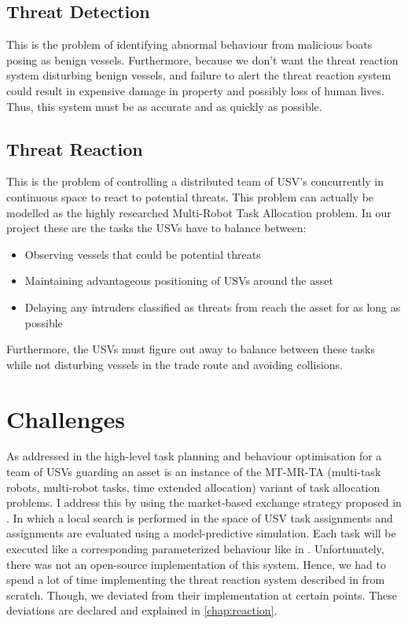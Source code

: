 \documentclass[bsc,frontabs,twoside,singlespacing,parskip,deptreport]{infthesis}     %
\begin{document}
\subsection{Threat Detection}
This is the problem of identifying abnormal behaviour from malicious boats posing as benign vessels. Furthermore, because we don't want the threat reaction system disturbing benign vessels, and failure to alert the threat reaction system could result in expensive damage in property and possibly loss of human lives. Thus, this system must be as accurate and as quickly as possible. 

\subsection{Threat Reaction}
This is the problem of controlling a distributed team of USV's concurrently in continuous space to react to potential threats. This problem can actually be modelled as the highly researched Multi-Robot Task Allocation problem. In our project these are the tasks the USVs have to balance between:

\begin{itemize}
    \item Observing vessels that could be potential threats
    \item Maintaining advantageous positioning of USVs around the asset
    \item Delaying any intruders classified as threats from reach the asset for as long as possible
\end{itemize}
Furthermore, the USVs must figure out away to balance between these tasks while not disturbing \nonthreatening vessels in the trade route and avoiding collisions.

\section{Challenges}
As addressed in \cite{raboin2013model} the high-level task planning and behaviour optimisation for a team of USVs guarding an asset is an instance of the MT-MR-TA (multi-task robots, multi-robot tasks, time extended allocation) variant of task allocation problems. I address this by using the market-based exchange strategy proposed in \cite{raboin2013model}. In which a local search is performed in the space of USV task assignments and assignments are evaluated using a model-predictive simulation. Each task will be executed like a corresponding parameterized behaviour like in \cite{raboin2013model}.
Unfortunately, there was not an open-source implementation of this system. Hence, we had to spend a lot of time implementing the threat reaction system described in \citep{raboin2013model} from scratch. Though, we deviated from their implementation at certain points. These deviations are declared and explained in \ref{chap:reaction}.
\end{document}
